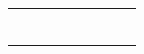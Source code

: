 \documentclass[12pt]{article}
\begin{document}
{\begin{tabular}{|c|c|c|c|c|c|c|c|}
        \multirow{2}{*}{} & \multirow{2}{*}{} &                      & \multirow{2}{*}{}            &                               & \multirow{2}{*}{}             &                               &                               \\\cline{3-3}\cline{5-5}\cline{7-7}
                          &                   & \multirow{2}{*}{}    &                              & \multirow{2}{*}{}             &                               & \multicolumn{1}{c}{}          &                               \\\cline{0-1}\cline{4-4}\cline{6-6}
        \multirow{2}{*}{} & \multirow{2}{*}{} &                      & \multirow{2}{*}{}            &                               & \multicolumn{1}{c}{}          & \multicolumn{1}{c}{}          &                               \\\cline{3-3}\cline{5-5}
                          &                   & \multirow{2}{*}{}    &                              & \multicolumn{1}{c}{}          & \multicolumn{1}{c}{}          & \multicolumn{1}{c}{}          &                               \\\cline{0-1}\cline{4-4}
        \multirow{2}{*}{} & \multirow{2}{*}{} &                      & \multicolumn{1}{c}{}         & \multicolumn{1}{c}{}          & \multicolumn{1}{c}{}          & \multicolumn{1}{c}{}          &                               \\\cline{3-3}
                          &                   & \multicolumn{1}{c}{} & \multicolumn{1}{c}{}         & \multicolumn{1}{c}{}          & \multicolumn{1}{c}{}          & \multicolumn{1}{c}{}          &                               \\\hline
    \end{tabular}
}
\end{document}
